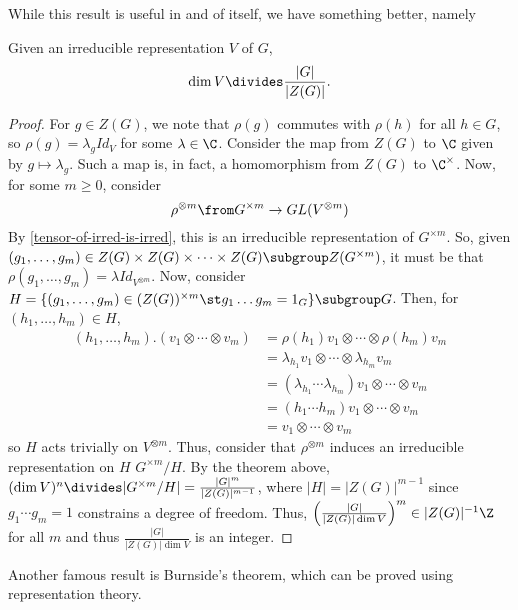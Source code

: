 \documentclass[11pt,leqno,oneside]{amsbook}
\numberwithin{thm}{section}
\begin{document}
While this result is useful in and of itself, we have something
better, namely 
\begin{thm}
  Given an irreducible representation \(V\) of \(G\), \[
    \dim V  \divides \frac{|G|}{|Z(G)|}.
  \]
\end{thm}
\begin{proof}
  For \(g \in Z(G)\), we note that \(\rho(g)\) commutes with
  \(\rho(h)\) for all \(h \in G\), so \(\rho(g) = \lambda_g Id_V\) for
  some \(\lambda \in \C\). Consider the map from \(Z(G)\) to \(\C\)
  given by \(g \mapsto \lambda_g\). Such a map is, in fact, a
  homomorphism from \(Z(G)\) to \(\C^\times\). Now, for some \(m \geq
  0\), consider \[
    \rho^{\otimes m} \from G^{\times m} \to GL(V^{\otimes m})
  \]
  By \ref{tensor-of-irred-is-irred}, this is an irreducible representation of \(G^{\times
    m}\). So, given \((g_1, \ldots, g_m) \in Z(G) \times Z(G)
  \times \cdots \times Z(G) \subgroup Z(G^{\times m})\), it must be
  that \(\rho(g_1, \ldots, g_m) = \lambda Id_{V^{\otimes m}}\). Now,
  consider \(H = \{(g_1, \ldots, g_m) \in (Z(G))^{\times m} \st g_1
  \ldots g_m = 1_G\} \subgroup G\). Then, for \((h_1, \ldots, h_m) \in
  H\),
  \begin{align*}
    (h_1, \ldots, h_m).(v_1 \otimes \cdots \otimes v_m)
    & = \rho(h_1)v_1 \otimes \cdots \otimes \rho(h_m)v_m \\
    & = \lambda_{h_1} v_1 \otimes \cdots \otimes \lambda_{h_m} v_m \\
    & = (\lambda_{h_1} \cdots \lambda_{h_m})v_1 \otimes \cdots \otimes
      v_m \\
    & = (h_1 \cdots h_m)v_1 \otimes \cdots \otimes v_m \\
    & = v_1 \otimes \cdots \otimes v_m
  \end{align*}
  so \(H\) acts trivially on \(V^{\otimes m}\). Thus, consider that
  \(\rho^{\otimes m}\) induces an irreducible representation on \(H\)
  \(G^{\times m}/H\). By the theorem above, \((\dim V)^n \divides
  |G^{\times m}/H| = \frac{|G|^m}{|Z(G)|^{m-1}}\), where \(|H| =
  |Z(G)|^{m-1}\) since \(g_1 \cdots g_m = 1\) constrains a degree of
  freedom. Thus, \(\left(\frac{|G|}{|Z(G)| \dim V}\right)^m \in
  |Z(G)|^{-1} \Z\) for all \(m\) and thus \(\frac{|G|}{|Z(G)| \dim
    V}\) is an integer.
\end{proof}
Another famous result is Burnside's theorem, which can be proved using
representation theory. 
\end{document}
